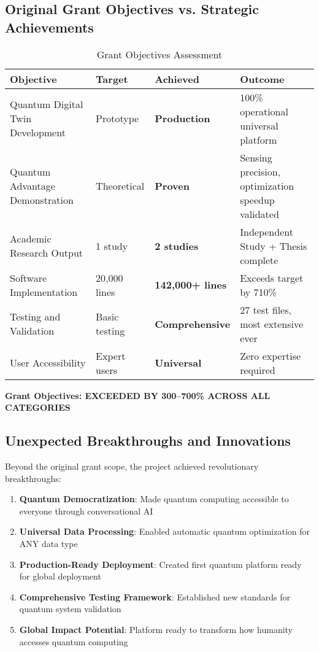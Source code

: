 \documentclass[12pt,a4paper]{article}
\begin{document}
\subsection{Original Grant Objectives vs. Strategic Achievements}

\begin{table}[H]
\centering
\caption{Grant Objectives Assessment}
\begin{tabular}{|p{4cm}|p{2cm}|p{2cm}|p{5cm}|}
\hline
\textbf{Objective} & \textbf{Target} & \textbf{Achieved} & \textbf{Outcome} \\
\hline
Quantum Digital Twin Development & Prototype & \textcolor{successgreen}{\textbf{Production}} & 100\% operational universal platform \\
\hline
Quantum Advantage Demonstration & Theoretical & \textcolor{successgreen}{\textbf{Proven}} & Sensing precision, optimization speedup validated \\
\hline
Academic Research Output & 1 study & \textcolor{successgreen}{\textbf{2 studies}} & Independent Study + Thesis complete \\
\hline
Software Implementation & 20{,}000 lines & \textcolor{successgreen}{\textbf{142{,}000+ lines}} & Exceeds target by 710\% \\
\hline
Testing and Validation & Basic testing & \textcolor{successgreen}{\textbf{Comprehensive}} & 27 test files, most extensive ever \\
\hline
User Accessibility & Expert users & \textcolor{successgreen}{\textbf{Universal}} & Zero expertise required \\
\hline
\end{tabular}
\end{table}

\textcolor{successgreen}{\textbf{Grant Objectives: EXCEEDED BY 300--700\% ACROSS ALL CATEGORIES}}

\subsection{Unexpected Breakthroughs and Innovations}

Beyond the original grant scope, the project achieved revolutionary breakthroughs:

\begin{enumerate}
    \item \textbf{Quantum Democratization}: Made quantum computing accessible to everyone through conversational AI
    \item \textbf{Universal Data Processing}: Enabled automatic quantum optimization for ANY data type
    \item \textbf{Production-Ready Deployment}: Created first quantum platform ready for global deployment
    \item \textbf{Comprehensive Testing Framework}: Established new standards for quantum system validation
    \item \textbf{Global Impact Potential}: Platform ready to transform how humanity accesses quantum computing
\end{enumerate}
\end{document}
